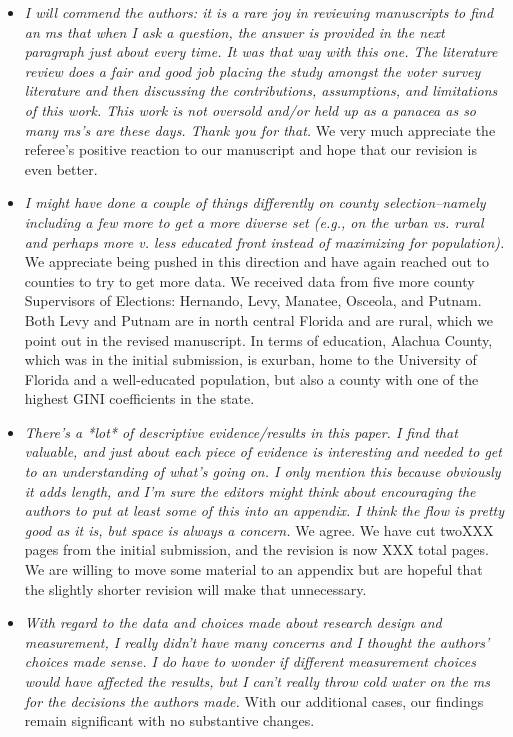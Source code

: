 \documentclass[12pt]{article}
\begin{document}
\begin{itemize}

\item \emph{I will commend the authors: it is a rare joy in reviewing
    manuscripts to find an ms that when I ask a question, the answer
    is provided in the next paragraph just about every time. It was
    that way with this one. The literature review does a fair and good
    job placing the study amongst the voter survey literature and then
    discussing the contributions, assumptions, and limitations of this
    work. This work is not oversold and/or held up as a panacea as so
    many ms's are these days. Thank you for that.}  We very much
  appreciate the referee's positive reaction to our manuscript and
  hope that our revision is even better.

\item \emph{I might have done a couple of things differently on county
    selection--namely including a few more to get a more diverse set
    (e.g., on the urban vs. rural and perhaps more v. less educated
    front instead of maximizing for population).}  We appreciate being
  pushed in this direction and have again reached out to counties to
  try to get more data.  We received data from five more county Supervisors
  of Elections: Hernando, Levy, Manatee, Osceola, and Putnam.  Both Levy and Putnam are 
  in north central Florida and are rural, which we point out in the revised manuscript.  In terms of
  education, Alachua County, which was in the initial submission, is exurban,  
  home to the University of Florida and a well-educated population, but also a county 
  with one of the highest GINI coefficients in the state. 


\item \emph{There's a *lot* of descriptive evidence/results in this
    paper. I find that valuable, and just about each piece of evidence
    is interesting and needed to get to an understanding of what's
    going on. I only mention this because obviously it adds length,
    and I'm sure the editors might think about encouraging the authors
    to put at least some of this into an appendix. I think the flow is
    pretty good as it is, but space is always a concern.}  We agree.
  We have cut twoXXX pages from the initial submission, and the
  revision is now XXX total pages.  We are willing to move some material
  to an appendix but are hopeful that the slightly shorter revision
  will make that unnecessary.

\item \emph{With regard to the data and choices made about research design and measurement, 
I really didn't have many concerns and I thought the authors' choices made sense. 
I do have to wonder if different measurement choices would have affected the results, but I 
can't really throw cold water on the ms for the decisions the authors made.} With our additional
cases, our findings remain significant with no substantive changes.


\end{itemize}
\end{document}
